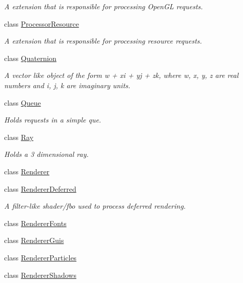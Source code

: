 \begin{DoxyCompactItemize}
\begin{DoxyCompactList}\small\item\em A extension that is responsible for processing Open\+GL requests. \end{DoxyCompactList}\item 
class \hyperlink{class_flounder_1_1_processor_resource}{Processor\+Resource}
\begin{DoxyCompactList}\small\item\em A extension that is responsible for processing resource requests. \end{DoxyCompactList}\item 
class \hyperlink{class_flounder_1_1_quaternion}{Quaternion}
\begin{DoxyCompactList}\small\item\em A vector like object of the form w + xi + yj + zk, where w, x, y, z are real numbers and i, j, k are imaginary units. \end{DoxyCompactList}\item 
class \hyperlink{class_flounder_1_1_queue}{Queue}
\begin{DoxyCompactList}\small\item\em Holds requests in a simple que. \end{DoxyCompactList}\item 
class \hyperlink{class_flounder_1_1_ray}{Ray}
\begin{DoxyCompactList}\small\item\em Holds a 3 dimensional ray. \end{DoxyCompactList}\item 
class \hyperlink{class_flounder_1_1_renderer}{Renderer}
\item 
class \hyperlink{class_flounder_1_1_renderer_deferred}{Renderer\+Deferred}
\begin{DoxyCompactList}\small\item\em A filter-\/like shader/fbo used to process deferred rendering. \end{DoxyCompactList}\item 
class \hyperlink{class_flounder_1_1_renderer_fonts}{Renderer\+Fonts}
\item 
class \hyperlink{class_flounder_1_1_renderer_guis}{Renderer\+Guis}
\item 
class \hyperlink{class_flounder_1_1_renderer_particles}{Renderer\+Particles}
\item 
class \hyperlink{class_flounder_1_1_renderer_shadows}{Renderer\+Shadows}
\item 

\end{DoxyCompactItemize}
